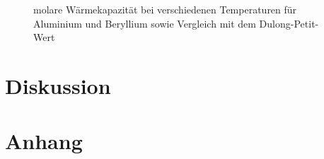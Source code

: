 \documentclass[12pt,a4paper,titlepage,headinclude,bibtotoc]{scrartcl}
\begin{document}
\begin{figure}[!htb]
	\centering
	
	\caption{molare Wärmekapazität bei verschiedenen Temperaturen für Aluminium und Beryllium sowie Vergleich mit dem Dulong-Petit-Wert}
	\label{fig:Leistung_Stick}
\end{figure}



\section{Diskussion}
\label{sec:diskussion}

\section{Anhang}

%
%
\end{document}
